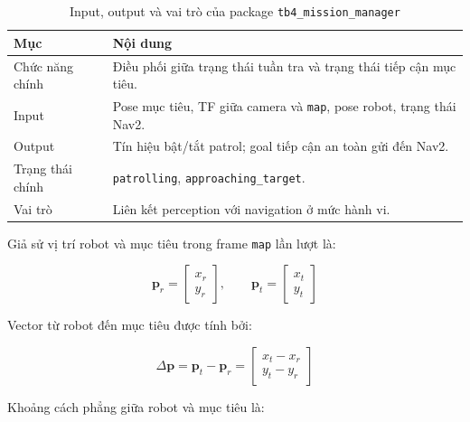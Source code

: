 \begin{table}[H]
    \centering
    \caption{Input, output và vai trò của package \texttt{tb4\_mission\_manager}}
    \label{tab:tb4-mission-manager}
    \renewcommand{\arraystretch}{1.25}
    \small
    \begin{tabularx}{\textwidth}{|>{\raggedright\arraybackslash}p{}|>{\raggedright\arraybackslash}X|}
        \hline
        \textbf{Mục} & \textbf{Nội dung} \\
        \hline
        Chức năng chính & Điều phối giữa trạng thái tuần tra và trạng thái tiếp cận mục tiêu. \\
        \hline
        Input & Pose mục tiêu, TF giữa camera và \texttt{map}, pose robot, trạng thái Nav2. \\
        \hline
        Output & Tín hiệu bật/tắt patrol; goal tiếp cận an toàn gửi đến Nav2. \\
        \hline
        Trạng thái chính & \texttt{patrolling}, \texttt{approaching\_target}. \\
        \hline
        Vai trò & Liên kết perception với navigation ở mức hành vi. \\
        \hline
    \end{tabularx}
\end{table}

Giả sử vị trí robot và mục tiêu trong frame \texttt{map} lần lượt là:

\begin{equation}
    \mathbf{p}_r =
    \begin{bmatrix}
        x_r \\ y_r
    \end{bmatrix},
    \qquad
    \mathbf{p}_t =
    \begin{bmatrix}
        x_t \\ y_t
    \end{bmatrix}
    \label{eq:robot-target-position}
\end{equation}

Vector từ robot đến mục tiêu được tính bởi:

\begin{equation}
    \Delta \mathbf{p} = \mathbf{p}_t - \mathbf{p}_r
    =
    \begin{bmatrix}
        x_t - x_r \\
        y_t - y_r
    \end{bmatrix}
    \label{eq:robot-target-vector}
\end{equation}

Khoảng cách phẳng giữa robot và mục tiêu là:

